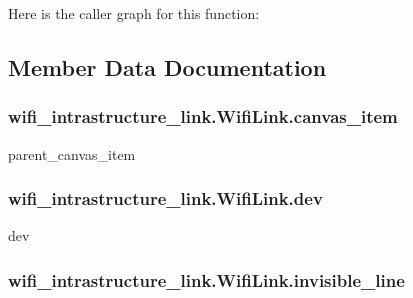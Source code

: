 Here is the caller graph for this function\+:




\subsection{Member Data Documentation}
\subsubsection[{\texorpdfstring{canvas\+\_\+item}{canvas_item}}]{\setlength{\rightskip}{0pt plus 5cm}wifi\+\_\+intrastructure\+\_\+link.\+Wifi\+Link.\+canvas\+\_\+item}\hypertarget{classwifi__intrastructure__link_1_1WifiLink_a45fdec8fed6b8aa9d749bfe55485d49e}{}\label{classwifi__intrastructure__link_1_1WifiLink_a45fdec8fed6b8aa9d749bfe55485d49e}


parent\+\_\+canvas\+\_\+item 

\subsubsection[{\texorpdfstring{dev}{dev}}]{\setlength{\rightskip}{0pt plus 5cm}wifi\+\_\+intrastructure\+\_\+link.\+Wifi\+Link.\+dev}\hypertarget{classwifi__intrastructure__link_1_1WifiLink_a08172890e1ead1ce5c3e03eaa166634a}{}\label{classwifi__intrastructure__link_1_1WifiLink_a08172890e1ead1ce5c3e03eaa166634a}


dev 

\subsubsection[{\texorpdfstring{invisible\+\_\+line}{invisible_line}}]{\setlength{\rightskip}{0pt plus 5cm}wifi\+\_\+intrastructure\+\_\+link.\+Wifi\+Link.\+invisible\+\_\+line}\hypertarget{classwifi__intrastructure__link_1_1WifiLink_adc2c71fbcb45b36e9f03b7150e6868fa}{}\label{classwifi__intrastructure__link_1_1WifiLink_adc2c71fbcb45b36e9f03b7150e6868fa}


